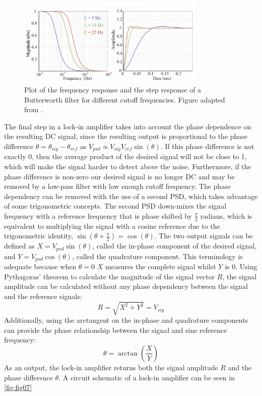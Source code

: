 \documentclass[a4paper,12pt, notitlepage]{article}
\begin{document}
\begin{figure}[t!]
\centering
\includegraphics[width=0.8\textwidth]{pictures/butterworthFilter.png}
\vspace{-2mm}
\caption{Plot of the frequency response and the step response of a Butterworth filter for different cutoff frequencies. Figure adapted from \cite{Bula2010}.}
\label{fig:fig06}
\end{figure}
The final step in a lock-in amplifier takes into account the phase dependence on the resulting DC signal, since the resulting output is proportional to the phase difference $\theta=\theta_{sig}-\theta_{ref}$ as $V_{psd} \propto V_{sig}V_{ref}\sin(\theta)$. 
If this phase difference is not exactly 0, then the average product of the desired signal will not be close to 1, which will make the signal harder to detect above the noise. Furthermore, if the phase difference is non-zero our desired signal is no longer DC and may be removed by a low-pass filter with low enough cutoff frequency.
The phase dependency can be removed with the use of a second PSD, which takes advantage of some trigonometric concepts. The second PSD down-mixes the signal frequency with a reference frequency that is phase shifted by $\frac{\pi}{2}$ radians, which is equivalent to multiplying the signal with a cosine reference due to the trigonometric identity, $\sin(\theta+\frac{\pi}{2}) = \cos(\theta)$. 
The two output signals can be defined as $X = V_{psd}\sin(\theta)$, called the in-phase component of the desired signal, and $Y = V_{psd}\cos(\theta)$, called the quadrature component. This terminology is adequate because when $\theta = 0$ $X$ measures the complete signal whilst $Y$ is $0$.
Using Pythagoras' theorem to calculate the magnitude of the signal vector $R$, the signal amplitude can be calculated without any phase dependency between the signal and the reference signals:
\begin{equation}
    R = \sqrt{X^{2}+Y^{2}} = V_{sig}
\end{equation}
Additionally, using the arctangent on the in-phase and quadrature components can provide the phase relationship between the signal and sine reference frequency:
\begin{equation}
    \theta = \arctan\left(\frac{X}{Y}\right)
\end{equation}
As an output, the lock-in amplifier returns both the signal amplitude $R$ and the phase difference $\theta$. A circuit schematic of a lock-in amplifier can be seen in \cref{fig:fig07}
\end{document}

